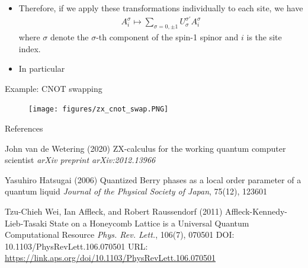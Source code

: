 \documentclass[aspectratio=169,xcolor=dvipsnames, t]{beamer}
\begin{document}
\begin{frame}
    \begin{itemize}
        \item Therefore, if we apply these transformations individually to each site, we have \begin{align*}
            A^{\sigma}_i \mapsto \sum_{\sigma=0,\pm 1}U^{\sigma'}_{\sigma} A_i^{\sigma}
        \end{align*}
        where $\sigma$ denote the $\sigma$-th component of the spin-1 spinor and $i$ is the site index.
        \item In particular 
    \end{itemize}
\end{frame}

\begin{frame}{Example: CNOT swapping}
    \begin{figure}
        \centering
        \texttt{[image: figures/zx\_cnot\_swap.PNG]}
    \end{figure}
\end{frame}



\begin{frame}{References}
    \footnotesize{
        \begin{thebibliography}{99}

             John van de Wetering (2020)
            \newblock ZX-calculus for the working quantum computer scientist
            \newblock \emph{arXiv preprint arXiv:2012.13966}
            
             Yasuhiro Hatsugai (2006)
            \newblock Quantized Berry phases as a local order parameter of a quantum liquid
            \newblock \emph{Journal of the Physical Society of Japan}, 75(12), 123601

             Tzu-Chieh Wei, Ian Affleck, and Robert Raussendorf (2011)
            \newblock Affleck-Kennedy-Lieb-Tasaki State on a Honeycomb Lattice is a Universal Quantum Computational Resource
            \newblock \emph{Phys. Rev. Lett.}, 106(7), 070501 DOI: 10.1103/PhysRevLett.106.070501
            \newblock URL: \url{https://link.aps.org/doi/10.1103/PhysRevLett.106.070501}
        \end{thebibliography}
    }
\end{frame}

\makefinalpage
\end{document}
